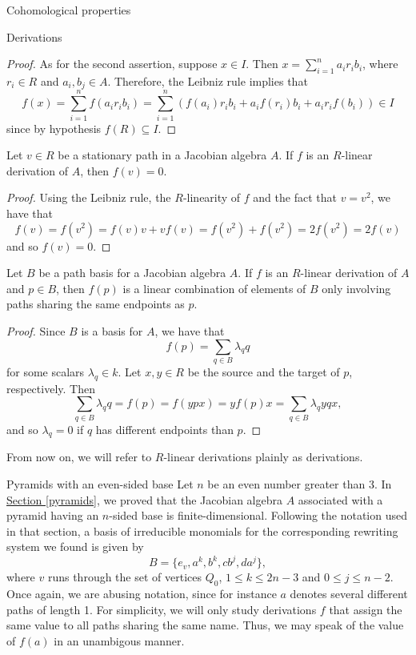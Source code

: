 \begin{chapter}{Cohomological properties}
\begin{section}{Derivations}
\begin{proof}
As for the second assertion, suppose $x\in I$. Then $x=\sum_{i=1}^n a_ir_ib_i$, where $r_i\in R$ and $a_i, b_j\in A$. Therefore, the Leibniz rule implies that
\[f(x) = \sum_{i=1}^n f(a_ir_ib_i)=\sum_{i=1}^n \left(f(a_i)r_ib_i + a_if(r_i)b_i + a_ir_if(b_i)\right)\in I\]
since by hypothesis $f(R)\subseteq I$.
\end{proof}
\begin{obs}\label{derivation-vertices} Let $v\in R$ be a stationary path in a Jacobian algebra $A$. If $f$ is an $R$-linear derivation of $A$, then $f(v)=0$.
\end{obs}
\begin{proof} Using the Leibniz rule, the $R$-linearity of $f$ and the fact that $v=v^2$, we have that
\[f(v)= f(v^2)= f(v)v + vf(v)=f(v^2)+ f(v^2)=2f(v^2)=2f(v)\]
and so $f(v)=0$.
\end{proof}
\begin{obs}\label{endpoints} Let $B$ be a path basis for a Jacobian algebra $A$. If $f$ is an $R$-linear derivation of $A$ and $p\in B$, then $f(p)$ is a linear combination of elements of $B$ only involving paths sharing the same endpoints as $p$.
\end{obs}
\begin{proof} Since $B$ is a basis for $A$, we have that
\[f(p) = \sum_{q\in B} \lambda_q q\]
for some scalars $\lambda_q\in k$. Let $x, y\in R$ be the source and the target of $p$, respectively. Then
\[\sum_{q\in B} \lambda_q q=f(p)=f(ypx) = yf(p)x =\sum_{q\in B} \lambda_q yqx,\]
and so $\lambda_q=0$ if $q$ has different endpoints than $p$.
\end{proof}
From now on, we will refer to $R$-linear derivations plainly as derivations.

\begin{subsection}{Pyramids with an even-sided base}
Let $n$ be an even number greater than 3. In \hyperref[pyramids]{Section \ref*{pyramids}}, we proved that the Jacobian algebra $A$ associated with a pyramid having an $n$-sided base is finite-dimensional. Following the notation used in that section, a basis of irreducible monomials for the corresponding rewriting system we found is given by
\[B=\{e_v,a^k,b^k,cb^j, da^j\},\] 
where $v$ runs through the set of vertices $Q_0$, $1\leq k\leq 2n-3$ and $0\leq j\leq n-2$. Once again, we are abusing notation, since for instance $a$ denotes several different paths of length 1. For simplicity, we will only study derivations $f$ that assign the same value to all paths sharing the same name. Thus, we may speak of the value of $f(a)$ in an unambigous manner.


\end{subsection}
\end{section}
\end{chapter}
